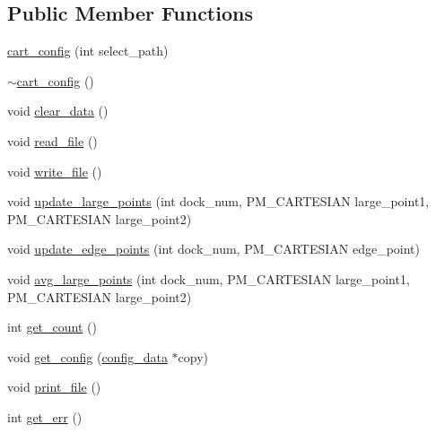 \subsection*{Public Member Functions}
\begin{DoxyCompactItemize}
\item 
\mbox{\hyperlink{classcart__config_a080069ffff0306121fc494e37b05fdd7}{cart\+\_\+config}} (int select\+\_\+path)
\item 
\mbox{\hyperlink{classcart__config_ae9aafdb5141c1e8851700c72d083fc9b}{$\sim$cart\+\_\+config}} ()
\item 
void \mbox{\hyperlink{classcart__config_a2e952dab59fce74b82bad81a3cf41ee2}{clear\+\_\+data}} ()
\item 
void \mbox{\hyperlink{classcart__config_a0b51cf14079dce155ac292ff43869c69}{read\+\_\+file}} ()
\item 
void \mbox{\hyperlink{classcart__config_afda8f2022ce8e2bb9a79f99cadad670c}{write\+\_\+file}} ()
\item 
void \mbox{\hyperlink{classcart__config_a1bd9d29b6529a9ada7404f1829da58a8}{update\+\_\+large\+\_\+points}} (int dock\+\_\+num, P\+M\+\_\+\+C\+A\+R\+T\+E\+S\+I\+AN large\+\_\+point1, P\+M\+\_\+\+C\+A\+R\+T\+E\+S\+I\+AN large\+\_\+point2)
\item 
void \mbox{\hyperlink{classcart__config_ab5f34a358566d6149efda9429eba9123}{update\+\_\+edge\+\_\+points}} (int dock\+\_\+num, P\+M\+\_\+\+C\+A\+R\+T\+E\+S\+I\+AN edge\+\_\+point)
\item 
void \mbox{\hyperlink{classcart__config_ad35fbb7f1aa613931ef059b40c94832b}{avg\+\_\+large\+\_\+points}} (int dock\+\_\+num, P\+M\+\_\+\+C\+A\+R\+T\+E\+S\+I\+AN large\+\_\+point1, P\+M\+\_\+\+C\+A\+R\+T\+E\+S\+I\+AN large\+\_\+point2)
\item 
int \mbox{\hyperlink{classcart__config_a3f52caad207b08c3b48554fcb2abb8a3}{get\+\_\+count}} ()
\item 
void \mbox{\hyperlink{classcart__config_ab4ae31c21f8865a8fe0db542c5de0a15}{get\+\_\+config}} (\mbox{\hyperlink{structconfig__data}{config\+\_\+data}} $\ast$copy)
\item 
void \mbox{\hyperlink{classcart__config_ae51db45ded29529cbb52878fddc001f7}{print\+\_\+file}} ()
\item 
int \mbox{\hyperlink{classcart__config_a4a9bcdd8b2ca21ea2a8622923aa32ea2}{get\+\_\+err}} ()
\end{DoxyCompactItemize}
